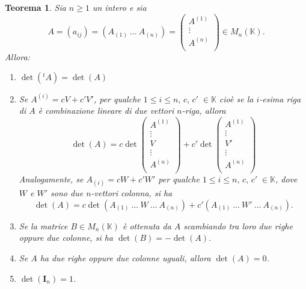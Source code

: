 \documentclass{article}
\theoremstyle{plain}
\newtheorem{thm}{Teorema}[section]
\theoremstyle{definition}
\theoremstyle{remark}
\begin{document}
\begin{bxthm}
\begin{thm}\label{quellolungo}
    Sia $n\geq1$ un intero e sia 
    \[A=(a_{ij})=(A_{(1)} \ \dots \ A_{(n)})=\begin{pmatrix}
        A^{(1)}\\
        \vdots\\
        A^{(n)}\\
    \end{pmatrix}\in M_n(\mathbb{K}).\]
    Allora:
    \begin{enumerate}
        \item $\det( ^{t}A)=\det(A)$
        \item Se $A^{(i)}=cV+c'V'$, per qualche $1\leq i\leq n,\, c,\, c'\;\in\mathbb{K}$
        cioè se la $i$-esima riga di $A$ è combinazione lineare di due vettori $n$-riga, allora 
        \[\det(A)=c\det\begin{pmatrix}
            A^{(1)}\\
            \vdots\\
            V\\
            \vdots\\
            A^{(n)}\\
        \end{pmatrix}+c'\det
        \begin{pmatrix}
            A^{(1)}\\
            \vdots\\
            V'\\
            \vdots\\
            A^{(n)}\\
        \end{pmatrix}\]
        Analogamente, se $A_{(i)}=cW+c'W'$ per qualche $1\leq i\leq n,\, c,\, c'\;\in\mathbb{K}$, dove $W$ e $W'$ sono due $n$-vettori colonna, si ha 
        \[\det(A)=c\det(A_{(1)} \ \dots \ W \ \dots \ A_{(n)})+c'(A_{(1)} \ \dots \ W' \ \dots \ A_{(n)}).\]
        \item Se la matrice $B\in M_n(\mathbb{K})$ è ottenuta da $A$ scambiando tra loro due righe oppure due colonne, si ha $\det(B)=-\det(A)$.
        \item Se $A$ ha due righe oppure due colonne uguali, allora $\det(A)=0$.
        \item $\det(\mathbf{I}_n)=1$.
    \end{enumerate}
\end{thm}
\end{bxthm}
\end{document}

